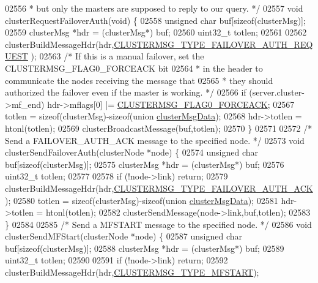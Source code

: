 \begin{DoxyCode}
{{{{{{{{{{{{{{{{{{{{{{{{{{{{{{{{{{{{{{{{02556 \textcolor{comment}{ * but only the masters are supposed to reply to our query. */}
02557 \textcolor{keywordtype}{void} clusterRequestFailoverAuth(\textcolor{keywordtype}{void}) \{
02558     \textcolor{keywordtype}{unsigned} \textcolor{keywordtype}{char} buf[\textcolor{keyword}{sizeof}(clusterMsg)];
02559     clusterMsg *hdr = (clusterMsg*) buf;
02560     uint32\_t totlen;
02561 
02562     clusterBuildMessageHdr(hdr,\hyperlink{cluster_8h_a739009308ed4cb5b19630a5f872408d2}{CLUSTERMSG\_TYPE\_FAILOVER\_AUTH\_REQUEST}
      );
02563     \textcolor{comment}{/* If this is a manual failover, set the CLUSTERMSG\_FLAG0\_FORCEACK bit}
02564 \textcolor{comment}{     * in the header to communicate the nodes receiving the message that}
02565 \textcolor{comment}{     * they should authorized the failover even if the master is working. */}
02566     \textcolor{keywordflow}{if} (server.cluster->mf\_end) hdr->mflags[0] |= \hyperlink{cluster_8h_a28600533c792367de5ec4fe2e8434376}{CLUSTERMSG\_FLAG0\_FORCEACK};
02567     totlen = \textcolor{keyword}{sizeof}(clusterMsg)-\textcolor{keyword}{sizeof}(\textcolor{keyword}{union} \hyperlink{unionclusterMsgData}{clusterMsgData});
02568     hdr->totlen = htonl(totlen);
02569     clusterBroadcastMessage(buf,totlen);
02570 \}
02571 
02572 \textcolor{comment}{/* Send a FAILOVER\_AUTH\_ACK message to the specified node. */}
02573 \textcolor{keywordtype}{void} clusterSendFailoverAuth(clusterNode *node) \{
02574     \textcolor{keywordtype}{unsigned} \textcolor{keywordtype}{char} buf[\textcolor{keyword}{sizeof}(clusterMsg)];
02575     clusterMsg *hdr = (clusterMsg*) buf;
02576     uint32\_t totlen;
02577 
02578     \textcolor{keywordflow}{if} (!node->link) \textcolor{keywordflow}{return};
02579     clusterBuildMessageHdr(hdr,\hyperlink{cluster_8h_ae0db3a998d7da521c5359bdd8708f5f6}{CLUSTERMSG\_TYPE\_FAILOVER\_AUTH\_ACK});
02580     totlen = \textcolor{keyword}{sizeof}(clusterMsg)-\textcolor{keyword}{sizeof}(\textcolor{keyword}{union} \hyperlink{unionclusterMsgData}{clusterMsgData});
02581     hdr->totlen = htonl(totlen);
02582     clusterSendMessage(node->link,buf,totlen);
02583 \}
02584 
02585 \textcolor{comment}{/* Send a MFSTART message to the specified node. */}
02586 \textcolor{keywordtype}{void} clusterSendMFStart(clusterNode *node) \{
02587     \textcolor{keywordtype}{unsigned} \textcolor{keywordtype}{char} buf[\textcolor{keyword}{sizeof}(clusterMsg)];
02588     clusterMsg *hdr = (clusterMsg*) buf;
02589     uint32\_t totlen;
02590 
02591     \textcolor{keywordflow}{if} (!node->link) \textcolor{keywordflow}{return};
02592     clusterBuildMessageHdr(hdr,\hyperlink{cluster_8h_aa875273b4b11ae73d3cd3a8aea4ddcba}{CLUSTERMSG\_TYPE\_MFSTART});
}}}}}}}}}}}}}}}}}}}}}}}}}}}}}}}}}}}}}}}}
\end{DoxyCode}
